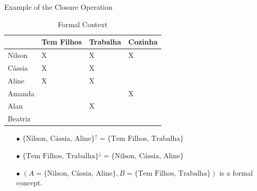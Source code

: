 \documentclass[pdf,xcolor=table]{beamer}
\begin{document}
\begin{frame}[t]{Example of the Closure Operation}
    \begin{table}[]
        \tiny
        \centering
        \caption{Formal Context}
        \begin{tabular}{@{}|l|l|l|l|@{}} \hline
                    & Tem Filhos & Trabalha & Cozinha \\\hline
            Nilson  & X          & X        & X       \\\hline
            Cássia  & X          & X        &         \\\hline
            Aline   & X          & X        &         \\\hline
            Amanda  &            &          & X       \\\hline
            Alan    &            & X        &         \\\hline
            Beatriz &            &          &         \\\hline
        \end{tabular}
    \end{table}
    \begin{itemize}
        \item[$\bullet$] $\{\text{Nilson, Cássia, Aline}\}^\uparrow = \{\text{Tem Filhos, Trabalha}\}$
        \item[$\bullet$] $\{\text{Tem Filhos, Trabalha}\}^\downarrow = \{\text{Nilson, Cássia, Aline}\}$
        \item[$\bullet$] $(A = \{\text{Nilson, Cássia, Aline}\}, B = \{\text{Tem Filhos, Trabalha}\})$ is a formal concept.
    \end{itemize}
\end{frame}
\end{document}
